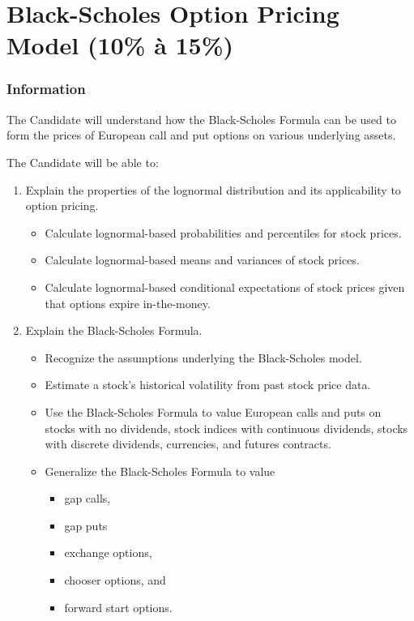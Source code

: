\chapter[Black-Scholes Option Pricing Model]{Black-Scholes Option Pricing Model (10\% à 15\%)}

\subsection{Information}

\begin{distributions}[Objective]
The Candidate will understand how the Black-Scholes Formula can be used to form the prices of European call and put options on various underlying assets.
\end{distributions}

\begin{outcomes}
The Candidate will be able to:
\begin{enumerate}[label = \alph*)]
	\item	Explain the properties of the lognormal distribution and its applicability to option pricing.
		\begin{knowledge}[]
		\begin{itemize}
		\item	Calculate lognormal-based probabilities and percentiles for stock prices. 
		\item	Calculate lognormal-based means and variances of stock prices.
		\item	Calculate lognormal-based conditional expectations of stock prices given that options expire in-the-money.
		\end{itemize}
		\end{knowledge}
	\item	Explain the Black-Scholes Formula.
		\begin{knowledge}[]
		\begin{itemize}
		\item	Recognize the assumptions underlying the Black-Scholes model.
		\item	Estimate a stock’s historical volatility from past stock price data.
		\item	Use the Black-Scholes Formula to value European calls and puts on stocks with no dividends, stock indices with continuous dividends, stocks with discrete dividends, currencies, and futures contracts.
		\item	Generalize the Black-Scholes Formula to value 
			\begin{itemize}
			\item	gap calls,
			\item	gap puts
			\item	exchange options, 
			\item	chooser options, and 
			\item	forward start options.
			\end{itemize}
		\end{itemize}
		\end{knowledge}
	\end{enumerate}
\end{outcomes}

